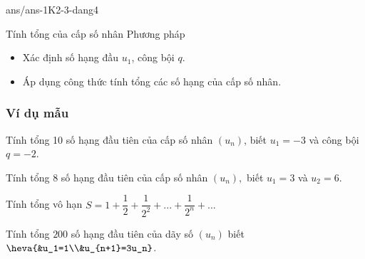 \begin{indapan}{10}
	{ans/ans-1K2-3-dang4}
\end{indapan}
\begin{dang}{Tính tổng của cấp số nhân}
	Phương pháp
	\begin{itemize}
		\item Xác định số hạng đầu $u_1$, công bội $q$.
		\item Áp dụng công thức tính tổng các số hạng của cấp số nhân. 
	\end{itemize}
\end{dang}
\subsubsection{Ví dụ mẫu}
\begin{vd}[NB]%
	Tính tổng 10 số hạng đầu tiên của cấp số nhân $(u_n)$, biết $u_1=-3$ và công bội $q=-2$. 
\end{vd}

\begin{vd}[TH]%
	Tính tổng $8$ số hạng đầu tiên của cấp số nhân $(u_n),$ biết $u_1=3$ và $u_2=6$. 
\end{vd}

\begin{vd}[TH]%
	Tính tổng vô hạn $S=1+\dfrac{1}{2}+\dfrac{1}{2^2}+...+\dfrac{1}{2^n}+...$ 
\end{vd}

\begin{vd}[VD]%
	Tính tổng $200$ số hạng đầu tiên của dãy số $(u_n)$ biết $\heva{&u_1=1\\&u_{n+1}=3u_n}$.
\end{vd}

